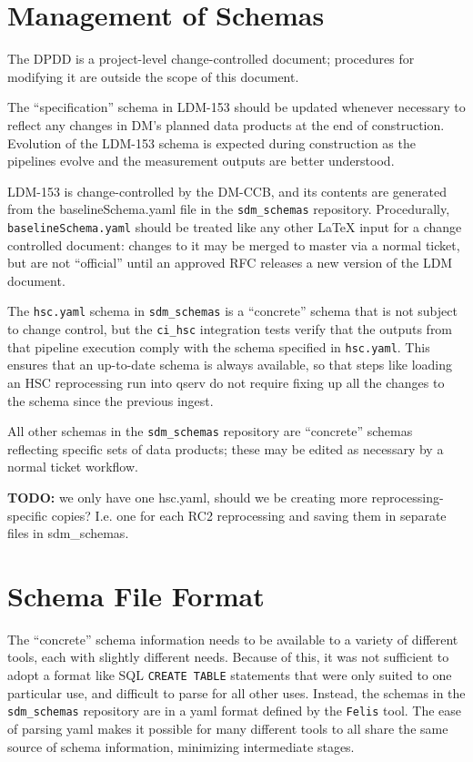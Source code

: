 \documentclass[DM,authoryear,toc]{lsstdoc}
\begin{document}
\section{Management of Schemas}


The DPDD is a project-level change-controlled document; procedures for modifying it are outside the
scope of this document.

The ``specification'' schema in LDM-153 should be updated whenever necessary to reflect any changes
in DM's planned data products at the end of construction. Evolution of the LDM-153 schema is
expected during construction as the pipelines evolve and the measurement outputs are better
understood.

LDM-153 is change-controlled by the DM-CCB, and its contents are generated from the baselineSchema.yaml file
in the \texttt{sdm\_schemas} repository. Procedurally, \texttt{baselineSchema.yaml} should be
treated like any other LaTeX input for a change controlled document: changes to it may be merged to
master via a normal ticket, but are not ``official'' until an approved RFC releases a new version of
the LDM document.

The \texttt{hsc.yaml} schema in \texttt{sdm\_schemas} is a ``concrete'' schema that is not subject
to change control, but the \texttt{ci\_hsc} integration tests verify that the outputs from that
pipeline execution comply with the schema specified in \texttt{hsc.yaml}. This ensures that an
up-to-date schema is always available, so that steps like loading an HSC reprocessing run into qserv
do not require fixing up all the changes to the schema since the previous ingest.

All other schemas in the \texttt{sdm\_schemas} repository are ``concrete'' schemas reflecting
specific sets of data products; these may be edited as necessary by a normal ticket workflow.

\textbf{TODO:} we only have one hsc.yaml, should we be creating more reprocessing-specific copies?
I.e. one for each RC2 reprocessing and saving them in separate files in sdm\_schemas.

\section{Schema File Format}

The ``concrete'' schema information needs to be available to a variety of different tools, each with
slightly different needs. Because of this, it was not sufficient to adopt a format like SQL
\texttt{CREATE TABLE} statements that were only suited to one particular use, and difficult to parse
for all other uses. Instead, the schemas in the \texttt{sdm\_schemas} repository are in a yaml
format defined by the \texttt{Felis} tool. The ease of parsing yaml makes it possible for many
different tools to all share the same source of schema information, minimizing intermediate stages.
\end{document}
